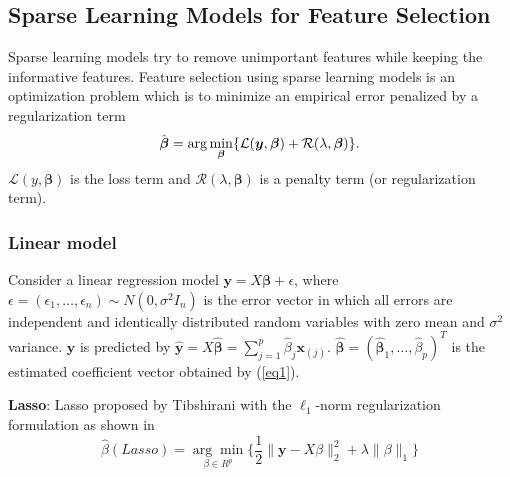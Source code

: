 \documentclass[lang=cn,10pt]{gorgeousnbook}
\numberwithin{equation}{section}%
\numberwithin{figure}{section}%
\begin{document}
\subsection{Sparse Learning Models for Feature Selection}
Sparse learning models try to remove unimportant features while keeping the informative features. Feature selection using sparse learning models is an optimization problem which is to minimize an empirical error penalized by a regularization term
\begin{equation}
\hat{\boldsymbol{\beta}}=\arg\min\limits_{\boldsymbol{\beta}}\{{\cal L}(\boldsymbol{y},\boldsymbol{\beta})+{\cal R}(\lambda,\boldsymbol{\beta})\}. 
\label{eq1}
\end{equation}
$\mathcal{L}(y,\boldsymbol{\beta})$ is the loss term and $\mathcal{R}(\lambda,\boldsymbol{\beta})$ is a penalty term (or
regularization term). 


\subsubsection{Linear model}
Consider a linear regression model $\boldsymbol{y}=X\boldsymbol{\beta}+\epsilon$, where $\epsilon=(\epsilon_1,\ldots,\epsilon_n)\sim N(0,\sigma^2I_n)$ is the error vector in which all errors are independent and identically distributed random
variables with zero mean and $\sigma^2$ variance. $\boldsymbol{y}$ is predicted by $\hat{\boldsymbol{y}}=X\hat{\boldsymbol{\beta}}=\sum_{j=1}^{p}\hat{\beta}_{j}\boldsymbol{x}_{(j)}$. $\hat{\boldsymbol{\beta}}=(\hat{\boldsymbol{\beta}}_{1},\ldots,\hat{\beta}_{p})^{T}$ is the estimated coefficient vector obtained by (\ref{eq1}).

\textbf{Lasso}: Lasso proposed by Tibshirani with the $\ell_1$-norm regularization formulation as shown in
\begin{equation}
\hat{\beta}(Lasso)=\underset{\beta\in R^p}{\operatorname{arg}\min}\bigg\{\frac{1}{2}\|\mathbf{y}-X\beta\|_2^2+\lambda\|\beta\|_1\bigg\}
\end{equation}
\end{document}
